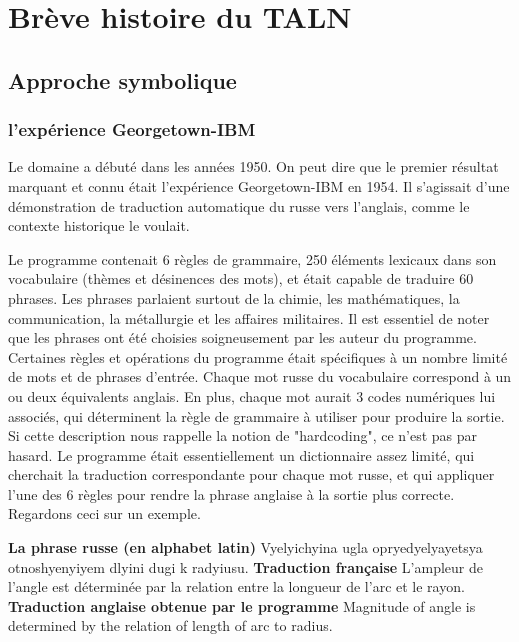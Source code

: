 \documentclass[11pt,a4paper]{report}
\begin{document}
\chapter{Brève histoire du TALN}
  \section*{Approche symbolique}
    \subsection*{l'expérience Georgetown-IBM}
    Le domaine a débuté dans les années 1950. On peut dire que le premier résultat 
    marquant et connu était l'expérience Georgetown-IBM en 1954. Il s'agissait d'une 
    démonstration de traduction automatique du russe vers l'anglais, comme le 
    contexte historique le voulait.

    Le programme contenait 6 règles de grammaire, 250 éléments lexicaux dans son 
    vocabulaire (thèmes et désinences des mots), et était capable de traduire 60 
    phrases. Les phrases parlaient surtout de la chimie, les mathématiques, la 
    communication, la métallurgie et les affaires militaires. Il est essentiel de 
    noter que les phrases ont été choisies soigneusement par les auteur du programme. 
    Certaines règles et opérations du programme était spécifiques à un nombre limité 
    de mots et de phrases d'entrée. Chaque mot russe du vocabulaire correspond à un ou deux 
    équivalents anglais. En plus, chaque mot aurait 3 codes numériques lui associés, qui 
    déterminent la règle de grammaire à utiliser pour produire la sortie. 
    Si cette description nous rappelle la notion de 
    "hardcoding", ce n'est pas par hasard. Le programme était essentiellement un 
    dictionnaire assez limité, qui cherchait la traduction correspondante pour chaque 
    mot russe, et qui appliquer l'une des 6 règles pour rendre la phrase anglaise 
    à la sortie plus correcte. Regardons ceci sur un exemple. 

    \noindent \textbf{La phrase russe (en alphabet latin)} \newline 
    Vyelyichyina ugla opryedyelyayetsya otnoshyenyiyem dlyini dugi k radyiusu. \newline  
    \textbf{Traduction française} \newline 
    L'ampleur de l'angle est déterminée par la relation entre la longueur de l'arc et le rayon. \newline 
    \textbf{Traduction anglaise obtenue par le programme} \newline 
    Magnitude of angle is determined by the relation of length of arc to radius.
\end{document}
